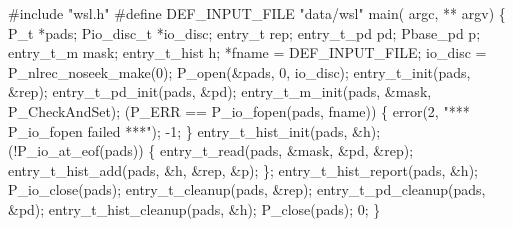\begin{centercode}
#include "wsl.h"
#define DEF\_INPUT\_FILE  "data/wsl"
\mbox{}
 main( argc, ** argv) \{
  P\_t                   *pads;
  Pio\_disc\_t           *io\_disc;
  entry\_t               rep;
  entry\_t\_pd           pd;
  Pbase\_pd              p;
  entry\_t\_m            mask;
  entry\_t\_hist         h;
                *fname = DEF\_INPUT\_FILE;
\mbox{}
  io\_disc = P\_nlrec\_noseek\_make(0);
  P\_open(&pads, 0, io\_disc);
\mbox{}
  entry\_t\_init(pads, &rep);
  entry\_t\_pd\_init(pads, &pd);
  entry\_t\_m\_init(pads, &mask, P\_CheckAndSet);
\mbox{}
   (P\_ERR == P\_io\_fopen(pads, fname)) \{
    error(2, "*** P\_io\_fopen failed ***");
     -1;
  \}
\mbox{}
  entry\_t\_hist\_init(pads, &h);
   (!P\_io\_at\_eof(pads)) \{
    entry\_t\_read(pads, &mask, &pd, &rep);
    entry\_t\_hist\_add(pads, &h, &rep, &p);
  \};
  entry\_t\_hist\_report(pads, &h);
\mbox{}
  P\_io\_close(pads);
  entry\_t\_cleanup(pads, &rep);
  entry\_t\_pd\_cleanup(pads, &pd);
  entry\_t\_hist\_cleanup(pads, &h);
  P\_close(pads);
   0;
\}
\end{centercode}
